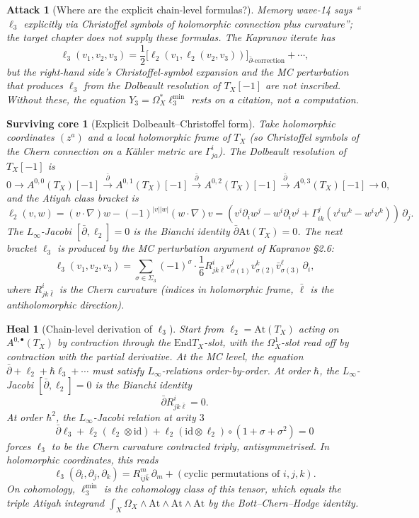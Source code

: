 \documentclass[11pt]{article}
\newtheorem{attack}[theorem]{Attack}
\newtheorem{heal}[theorem]{Heal}
\newtheorem{surviving}[theorem]{Surviving core}
\providecommand{\At}{\mathrm{At}}
\providecommand{\End}{\mathrm{End}}
\providecommand{\Om}{\Omega}
\providecommand{\id}{\mathrm{id}}
\begin{document}
\begin{attack}[Where are the explicit chain-level formulas?]
\label{atk:3}
Memory wave-14 says ``$\ell_3$ explicitly via Christoffel symbols of
holomorphic connection plus curvature''; the target chapter does not
supply these formulas. The Kapranov iterate has
\[
  \ell_3(v_1, v_2, v_3) = \frac{1}{2}\bigl[\ell_2(v_1, \ell_2(v_2, v_3))
    \bigr]_{\bar\partial\text{-correction}} + \cdots,
\]
but the right-hand side's Christoffel-symbol expansion and the MC
perturbation that produces $\ell_3$ from the Dolbeault resolution of
$T_X[-1]$ are not inscribed. Without these, the equation $Y_3 = \Om_X^*
\ell_3^{\min}$ rests on a citation, not a computation.
\end{attack}

\begin{surviving}[Explicit Dolbeault--Christoffel form]
\label{surv:3}
Take holomorphic coordinates $(z^a)$ and a local holomorphic frame of
$T_X$ (so Christoffel symbols of the Chern connection on a K\"ahler
metric are $\Gamma^i_{ja}$). The Dolbeault resolution of $T_X[-1]$ is
\[
  0 \to A^{0,0}(T_X)[-1] \xrightarrow{\bar\partial} A^{0,1}(T_X)[-1]
    \xrightarrow{\bar\partial} A^{0,2}(T_X)[-1] \xrightarrow{\bar\partial}
    A^{0,3}(T_X)[-1] \to 0,
\]
and the Atiyah class bracket is
\[
  \ell_2(v, w) = (v \cdot \nabla) w - (-1)^{|v||w|}(w \cdot \nabla) v =
  (v^i \partial_i w^j - w^i \partial_i v^j + \Gamma^j_{ik}(v^i w^k -
    w^i v^k)) \, \partial_j.
\]
The $L_\infty$-Jacobi $[\bar\partial, \ell_2] = 0$ is the Bianchi
identity $\bar\partial \At(T_X) = 0$. The next bracket $\ell_3$ is
produced by the MC perturbation argument of Kapranov \S 2.6:
\[
  \ell_3(v_1, v_2, v_3) = \sum_{\sigma \in \Sigma_3} (-1)^\sigma \cdot
    \frac{1}{6} R^i_{jk\bar\ell} v_{\sigma(1)}^j v_{\sigma(2)}^k
    \bar{v}_{\sigma(3)}^\ell \, \partial_i,
\]
where $R^i_{jk\bar\ell}$ is the Chern curvature (indices in holomorphic
frame, $\bar\ell$ is the antiholomorphic direction).
\end{surviving}

\begin{heal}[Chain-level derivation of $\ell_3$]
\label{heal:3}
Start from $\ell_2 = \At(T_X)$ acting on $A^{0,\bullet}(T_X)$ by
contraction through the $\End T_X$-slot, with the $\Om^1_X$-slot
read off by contraction with the partial derivative. At the MC level,
the equation $\bar\partial + \ell_2 + \hbar \ell_3 + \cdots$ must
satisfy $L_\infty$-relations order-by-order. At order $\hbar$, the
$L_\infty$-Jacobi $[\bar\partial, \ell_2] = 0$ is the Bianchi identity
\[
  \bar\partial R^i_{jk\bar\ell} = 0.
\]
At order $\hbar^2$, the $L_\infty$-Jacobi relation at arity $3$
\[
  \bar\partial \ell_3 + \ell_2(\ell_2 \otimes \id) + \ell_2(\id \otimes
    \ell_2) \circ (1 + \sigma + \sigma^2) = 0
\]
forces $\ell_3$ to be the Chern curvature contracted triply,
antisymmetrised. In holomorphic coordinates, this reads
\[
  \ell_3(\partial_i, \partial_j, \partial_k) = R^m_{ij\bar k}\,
  \partial_m + (\text{cyclic permutations of $i,j,k$}).
\]
On cohomology, $\ell_3^{\min}$ is the cohomology class of this
tensor, which equals the triple Atiyah integrand $\int_X \Om_X \wedge
\At \wedge \At \wedge \At$ by the Bott--Chern--Hodge identity.
\end{heal}
\end{document}

